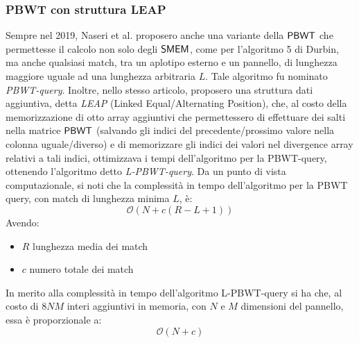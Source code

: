 \subsubsection{PBWT con struttura LEAP}
Sempre nel 2019, Naseri et al. \cite{leap} proposero anche una variante della
$\mbox{\rm {\sf PBWT}}$ 
che permettesse il calcolo non solo degli $\mbox{\rm {\sf SMEM}}$, come per l'algoritmo 5
di Durbin, ma anche qualsiasi match, tra un aplotipo esterno e un pannello, di
lunghezza 
maggiore uguale ad una 
lunghezza arbitraria $L$. Tale algoritmo fu nominato
\textit{PBWT-query}. Inoltre, nello 
stesso articolo, proposero 
una struttura dati aggiuntiva, detta \textit{LEAP} (Linked
Equal/Alternating Position), che, al costo della 
memorizzazione di otto array aggiuntivi che permettessero di effettuare dei
salti nella matrice $\mbox{\rm {\sf PBWT}}$ (salvando gli indici del precedente/prossimo
valore nella colonna uguale/diverso) e di memorizzare gli indici dei valori
nel divergence array relativi a tali indici, ottimizzava i tempi
dell'algoritmo per la PBWT-query, ottenendo l'algoritmo detto
\textit{L-PBWT-query}.
Da un punto di vista computazionale, si noti che la complessità in tempo
dell'algoritmo 
per la PBWT query, con match di lunghezza minima $L$, è:
\begin{equation}
  \label{eq:leap1}
  \mathcal{O}(N+c(R-L+1))
\end{equation}
Avendo:
\begin{itemize}
  \item $R$ lunghezza media dei match
  \item $c$ numero totale dei match
\end{itemize}
In merito alla complessità in tempo dell'algoritmo L-PBWT-query si ha che, al
costo di $8NM$ interi aggiuntivi in memoria, con $N$ e $M$ dimensioni del
pannello, essa è proporzionale a: 
\begin{equation}
  \label{eq:leap2}
  \mathcal{O}(N+c)
\end{equation}
